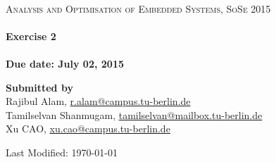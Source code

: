 \begin{titlepage}
\begin{center}

~\\[3cm]
\textsc{\Large Analysis and Optimisation of Embedded Systems,
SoSe 2015}\\[1.5cm]

\HRule \\[0.5cm]
{ \huge \bfseries Exercise 2 \\[0.4cm] }
\HRule \\[0.5cm]
\textbf{Due date: July 02, 2015}

\vfill
\begin{flushleft}
\textbf{Submitted by} \\[0.3cm]
Rajibul Alam, 
\href{mailto:r.alam@campus.tu-berlin.de}{r.alam@campus.tu-berlin.de} \\
Tamilselvan Shanmugam, 
\href{mailto:tamilselvan@mailbox.tu-berlin.de}{tamilselvan@mailbox.tu-berlin.de} \\
Xu CAO,
\href{mailto:xu.cao@campus.tu-berlin.de}{xu.cao@campus.tu-berlin.de} \\
\end{flushleft}

\vspace{1cm}
\begin{flushright}
{\large Last Modified: \today}
\end{flushright}
\end{center}

\end{titlepage}
